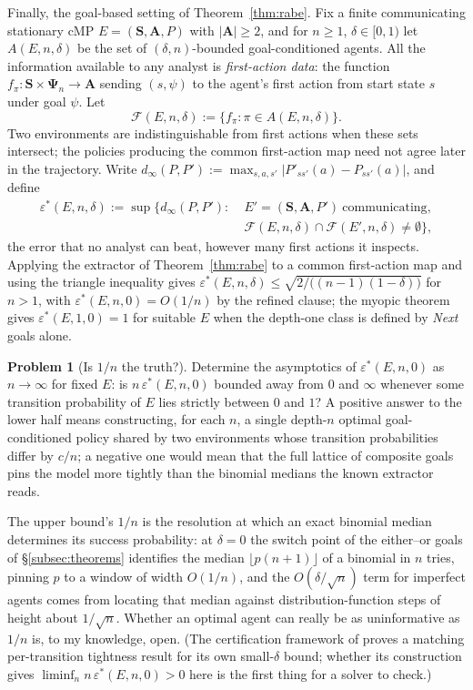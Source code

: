 \documentclass[11pt]{amsart}
\theoremstyle{plain}
\theoremstyle{definition}
\newtheorem{problem}[theorem]{Problem}
\newcommand{\bS}{\mathbf{S}}
\newcommand{\bA}{\mathbf{A}}
\newcommand{\bPsi}{\boldsymbol{\Psi}}
\begin{document}
Finally, the goal-based setting of Theorem~\ref{thm:rabe}. Fix a finite communicating stationary cMP $E=(\bS,\bA,P)$ with $|\bA|\ge2$, and for $n\ge1$, $\delta\in[0,1)$ let $A(E,n,\delta)$ be the set of $(\delta,n)$-bounded goal-conditioned agents. All the information available to any analyst is \emph{first-action data}: the function $f_\pi\colon \bS\times\bPsi_n\to\bA$ sending $(s,\psi)$ to the agent's first action from start state $s$ under goal $\psi$. Let
\[
   \mathcal F(E,n,\delta):=\{f_\pi:\pi\in A(E,n,\delta)\}.
\]
Two environments are indistinguishable from first actions when these sets intersect; the policies producing the common first-action map need not agree later in the trajectory. Write \(d_\infty(P,P'):=\max_{s,a,s'}|P'_{ss'}(a)-P_{ss'}(a)|\), and define
\[
 \begin{aligned}
   \varepsilon^*(E,n,\delta):=\sup\bigl\{d_\infty(P,P'):\;&E'=(\bS,\bA,P')\ \text{communicating},\\
   &\mathcal F(E,n,\delta)\cap\mathcal F(E',n,\delta)\neq\emptyset\bigr\},
 \end{aligned}
\]
the error that no analyst can beat, however many first actions it inspects. Applying the extractor of Theorem~\ref{thm:rabe} to a common first-action map and using the triangle inequality gives $\varepsilon^*(E,n,\delta)\le\sqrt{2/\bigl((n-1)(1-\delta)\bigr)}$ for $n>1$, with $\varepsilon^*(E,n,0)=O(1/n)$ by the refined clause; the myopic theorem gives $\varepsilon^*(E,1,0)=1$ for suitable $E$ when the depth-one class is defined by \emph{Next} goals alone.

\begin{problem}[Is $1/n$ the truth?]\label{prob:rate}
Determine the asymptotics of $\varepsilon^*(E,n,0)$ as $n\to\infty$ for fixed $E$: is $n\,\varepsilon^*(E,n,0)$ bounded away from $0$ and $\infty$ whenever some transition probability of $E$ lies strictly between $0$ and $1$? A positive answer to the lower half means constructing, for each $n$, a single depth-$n$ optimal goal-conditioned policy shared by two environments whose transition probabilities differ by $c/n$; a negative one would mean that the full lattice of composite goals pins the model more tightly than the binomial medians the known extractor reads.
\end{problem}

The upper bound's $1/n$ is the resolution at which an exact binomial median determines its success probability: at $\delta=0$ the switch point of the either--or goals of \S\ref{subsec:theorems} identifies the median $\lfloor p(n+1)\rfloor$ of a binomial in $n$ tries, pinning $p$ to a window of width $O(1/n)$, and the $O(\delta/\sqrt{n})$ term for imperfect agents comes from locating that median against distribution-function steps of height about $1/\sqrt{n}$. Whether an optimal agent can really be as uninformative as $1/n$ is, to my knowledge, open. (The certification framework of \cite{lu2026} proves a matching per-transition tightness result for its own small-$\delta$ bound; whether its construction gives $\liminf_n n\,\varepsilon^*(E,n,0)>0$ here is the first thing for a solver to check.)
\end{document}
